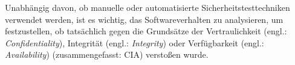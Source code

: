 Unabhängig davon, ob manuelle oder automatisierte Sicherheitstesttechniken verwendet werden, ist es wichtig, das Softwareverhalten zu analysieren, um festzustellen, ob tatsächlich gegen die Grundsätze der Vertraulichkeit (engl.: \textit{Confidentiality}), Integrität (engl.: \textit{Integrity}) oder Verfügbarkeit (engl.: \textit{Availability}) (zusammengefasst: CIA) verstoßen wurde\cite{moaast17}.











